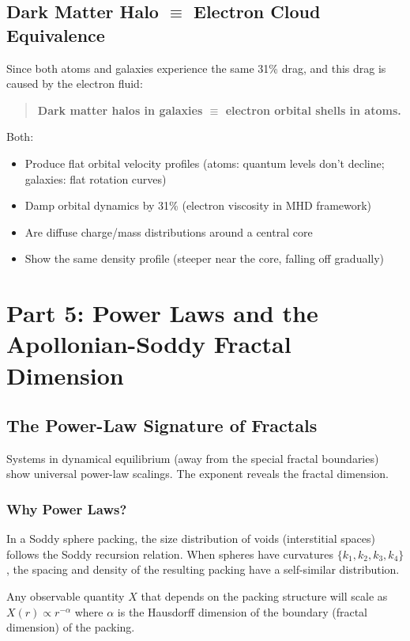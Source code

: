 \documentclass[11pt,a4paper]{article}
\begin{document}
\subsection{Dark Matter Halo $\equiv$ Electron Cloud Equivalence}

Since both atoms and galaxies experience the same 31\% drag, and this drag is caused by the electron fluid:

\begin{quote}
\textbf{Dark matter halos in galaxies $\equiv$ electron orbital shells in atoms.}
\end{quote}

Both:
\begin{itemize}
\item Produce flat orbital velocity profiles (atoms: quantum levels don't decline; galaxies: flat rotation curves)
\item Damp orbital dynamics by 31\% (electron viscosity in MHD framework)
\item Are diffuse charge/mass distributions around a central core
\item Show the same density profile (steeper near the core, falling off gradually)
\end{itemize}

\section{Part 5: Power Laws and the Apollonian-Soddy Fractal Dimension}

\subsection{The Power-Law Signature of Fractals}

Systems in dynamical equilibrium (away from the special fractal boundaries) show universal power-law scalings. The exponent reveals the fractal dimension.

\subsubsection{Why Power Laws?}

In a Soddy sphere packing, the size distribution of voids (interstitial spaces) follows the Soddy recursion relation. When spheres have curvatures $\{k_1, k_2, k_3, k_4\}$, the spacing and density of the resulting packing have a self-similar distribution.

Any observable quantity $X$ that depends on the packing structure will scale as $X(r) \propto r^{-\alpha}$ where $\alpha$ is the Hausdorff dimension of the boundary (fractal dimension) of the packing.
\end{document}
